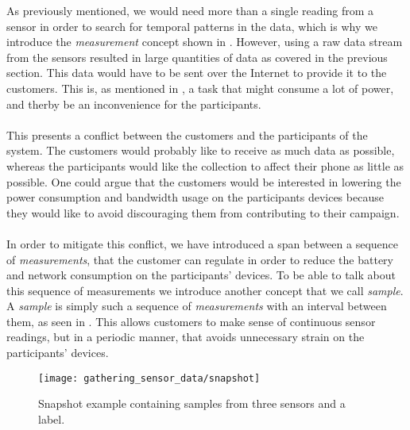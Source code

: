 As previously mentioned, we would need more than a single reading from a sensor in order to search for temporal patterns in the data, which is why we introduce the \emph{measurement} concept shown in . However, using a raw data stream from the sensors resulted in large quantities of data as covered in the previous section. This data would have to be sent over the Internet to provide it to the customers. This is, as mentioned in , a task that might consume a lot of power, and therby be an inconvenience for the participants. 
\\\\
This presents a conflict between the customers and the participants of the system. The customers would probably like to receive as much data as possible, whereas the participants would like the collection to affect their phone as little as possible. One could argue that the customers would be interested in lowering the power consumption and bandwidth usage on the participants devices because they would like to avoid discouraging them from contributing to their campaign. 
\\\\
In order to mitigate this conflict, we have introduced a span between a sequence of \emph{measurements}, that the customer can regulate in order to reduce the battery and network consumption on the participants' devices. To be able to talk about this sequence of measurements we introduce another concept that we call \emph{sample}. A \emph{sample} is simply such a sequence of \emph{measurements} with an interval between them, as seen in . This allows customers to make sense of continuous sensor readings, but in a periodic manner, that avoids unnecessary strain on the participants' devices.

\begin{figure}[!htbp]
    \centering
    \texttt{[image: gathering\_sensor\_data/snapshot]}
    \caption{Snapshot example containing samples from three sensors and a label.}
    \label{fig:snapshot_example_with_samples}
\end{figure}
\FloatBarrier

